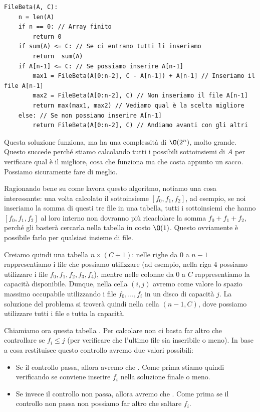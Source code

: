 \documentclass[11pt, a4paper, titlepage, oneside]{scrbook}
\begin{document}
\begin{lstlisting}
FileBeta(A, C):
    n = len(A)
    if n == 0: // Array finito
        return 0
    if sum(A) <= C: // Se ci entrano tutti li inseriamo
        return  sum(A)
    if A[n-1] <= C: // Se possiamo inserire A[n-1]
        max1 = FileBeta(A[0:n-2], C - A[n-1]) + A[n-1] // Inseriamo il file A[n-1]
        max2 = FileBeta(A[0:n-2], C) // Non inseriamo il file A[n-1]  
        return max(max1, max2) // Vediamo qual è la scelta migliore
    else: // Se non possiamo inserire A[n-1]
        return FileBeta(A[0:n-2], C) // Andiamo avanti con gli altri
\end{lstlisting}

Questa soluzione funziona, ma ha una complessità di $\O(2^n)$, molto grande. Questo succede perché stiamo calcolando tutti i possibili sottoinsiemi di $A$ per verificare qual è il migliore, cosa che funziona ma che costa appunto un sacco. Possiamo sicuramente fare di meglio.

Ragionando bene su come lavora questo algoritmo, notiamo una cosa interessante: una volta calcolato il sottoinsieme $[f_0, f_1, f_2]$, ad esempio, se noi inseriamo la somma di questi tre file in una tabella, tutti i sottoinsiemi che hanno $[f_0, f_1, f_2]$ al loro interno non dovranno più ricaclolare la somma $f_0 + f_1 + f_2$, perché gli basterà cercarla nella tabella in costo $\O(1)$. Questo ovviamente è possibile farlo per qualsiasi insieme di file. 

Creiamo quindi una tabella $n \times (C+1)$: nelle righe da $0$ a $n-1$ rappresentiamo i file che possiamo utilizzare (ad esempio, nella riga $4$ possiamo utilizzare i file $f_0, f_1, f_2, f_3, f_4$), mentre nelle colonne da $0$ a $C$ rappresentiamo la capacità disponibile. Dunque, nella cella $(i,j)$ avremo come valore lo spazio massimo occupabile utilizzando i file $f_0, \ldots, f_i$ in un disco di capacità $j$. La soluzione del problema si troverà quindi nella cella $(n-1, C)$, dove possiamo utilizzare tutti i file e tutta la capacità.

Chiamiamo ora questa tabella . Per calcolare  non ci basta far altro che controllare se $f_i \leq j$ (per verificare che l'ultimo file sia inseribile o meno). In base a cosa restituisce questo controllo avremo due valori possibili:
\begin{itemize}
    \item Se il controllo passa, allora avremo che \mbox{}. Come prima stiamo quindi verificando se conviene inserire $f_i$ nella soluzione finale o meno.
    \item Se invece il controllo non passa, allora avremo che . Come prima se il controllo non passa non possiamo far altro che saltare $f_i$.
\end{itemize}
\end{document}
